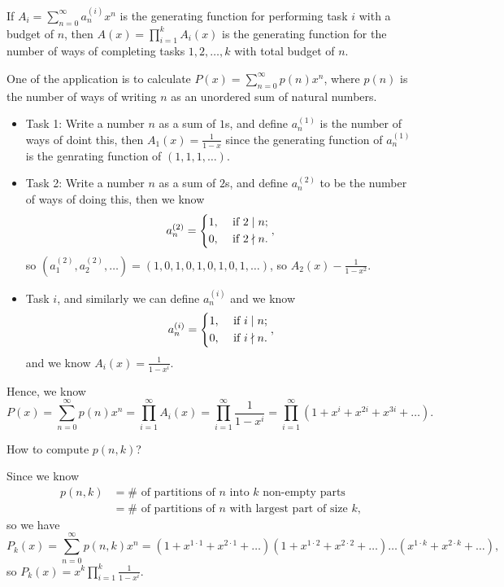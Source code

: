\begin{prev}
    If \(A_i = \sum_{n=0}^{\infty} a_n^{(i)} x^n \) is the generating function for performing task \(i\) with a budget of \(n\), then \(A(x) = \prod _{i=1}^k A_i(x) \) is the generating function for the number of ways of completing tasks \(1, 2, \dots , k\) with total budget of \(n\).      
\end{prev}

One of the application is to calculate \(P(x) = \sum_{n=0}^{\infty} p(n) x^n \), where \(p(n)\) is the number of ways of writing \(n\) as an unordered sum of natural numbers. 
\begin{itemize}
    \item Task 1: Write a number \(n\) as a sum of \(1\)s, and define \(a_n^{(1)}\) is the number of ways of doint this, then \(A_1(x) = \frac{1}{1-x}\) since the generating function of \(a_n^{(1)}\) is the genrating function of \((1,1,1, \dots )\). 
    \item Task 2: Write a number \(n\) as a sum of \(2\)s, and define \(a_n^{(2)}\) to be the number of ways of doing this, then we know 
    \[
        a_n^{(2)} = \begin{dcases}
            1, &\text{ if }  2 \mid n;\\
            0, &\text{ if }  2 \nmid n.
        \end{dcases},
    \]so \(\left( a_1^{(2)}, a_2^{(2)}, \dots  \right) = (1, 0, 1, 0, 1, 0, 1, 0, 1, \dots ) \), so \(A_2(x) - \frac{1}{1-x^2}\). 
    \item Task \(i\), and similarly we can define \(a_n^{(i)}\) and we know 
    \[
        a_n^{(i)} = \begin{dcases}
            1, &\text{ if }  i \mid n;\\
            0, &\text{ if }  i \nmid n.
        \end{dcases} ,
    \] and we know \(A_i(x) = \frac{1}{1 - x^i}\). 
\end{itemize}   
Hence, we know 
\[
    P(x) = \sum_{n=0}^{\infty} p(n)x^n = \prod_{i=1}^{\infty} A_i(x) = \prod_{i=1}^{\infty} \frac{1}{1-x^i} = \prod _{i=1}^{\infty} \left( 1 + x^i + x^{2i} + x^{3i} + \dots  \right).   
\]

\begin{eg}
    How to compute \(p(n, k)\)? 
\end{eg}
\begin{explanation}
    Since we know 
    \begin{align*}
        p(n, k) &= \# \text{ of partitions of } n \text{ into } k \text{ non-empty parts} \\
        &= \# \text{ of partitions of } n \text{ with largest part of size } k,     
    \end{align*}
    so we have 
    \[
        P_k(x) = \sum_{n=0}^{\infty} p(n, k) x^n = \left( 1 + x^{1 \cdot 1} + x^{2 \cdot 1} + \dots  \right) \left( 1 + x^{1 \cdot 2} + x^{2 \cdot 2} + \dots  \right) \dots \left( x^{1 \cdot k} + x^{2 \cdot k} + \dots  \right),   
    \] so \(P_k(x) = x^k \prod _{i=1}^k \frac{1}{1 - x^i}\). 
\end{explanation}

